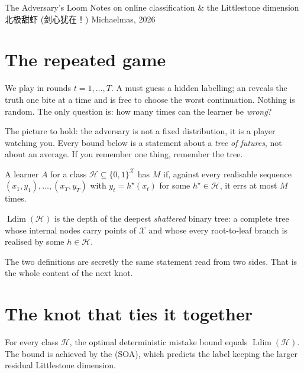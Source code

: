 \documentclass[cjk]{loom}
\begin{document}
\loomcover
  {The Adversary's Loom}
  {Notes on online classification \& the Littlestone dimension}
  {北极甜虾 (剑心犹在！)}
  {Michaelmas, 2026}

\section{The repeated game}

We play in rounds $t=1,\dots,T$. A  must guess a hidden
labelling; an  reveals the truth one bite at a time and is
free to choose the worst continuation. Nothing is random. The only question is:
how many times can the learner be \emph{wrong}?

\begin{strand}
The picture to hold: the adversary is not a fixed distribution, it is a player
watching you. Every bound below is a statement about a \emph{tree of futures},
not about an average. If you remember one thing, remember the tree.
\end{strand}

\begin{definition}
A learner $A$ for a class $\mathcal H \subseteq \{0,1\}^{\mathcal X}$ has
 $M$ if, against every realisable sequence
$(x_1,y_1),\dots,(x_T,y_T)$ with $y_t = h^\star(x_t)$ for some
$h^\star \in \mathcal H$, it errs at most $M$ times.
\end{definition}

%
\begin{definition}
$\operatorname{Ldim}(\mathcal H)$ is the depth of the deepest \emph{shattered}
binary tree: a complete tree whose internal nodes carry points of $\mathcal X$
and whose every root-to-leaf branch is realised by some $h \in \mathcal H$.
\end{definition}

%
The two definitions are secretly the same statement read from two sides. That
is the whole content of the next knot.

\section{The knot that ties it together}

\begin{theorem}[Littlestone, 1988]\label{thm:soa}
For every class $\mathcal H$, the optimal deterministic mistake bound equals
$\operatorname{Ldim}(\mathcal H)$. The bound is achieved by the
 (SOA), which predicts the label keeping the
larger residual Littlestone dimension.
\end{theorem}
\end{document}
